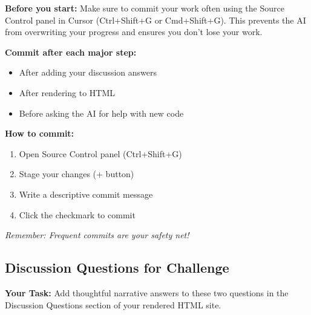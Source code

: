 \documentclass[
  letterpaper,
  DIV=11,
  numbers=noendperiod]{scrartcl}
\providecommand{\tightlist}{%
  \setlength{\itemsep}{0pt}\setlength{\parskip}{0pt}}
\begin{document}
\begin{tcolorbox}[enhanced jigsaw, bottomtitle=1mm, coltitle=black, rightrule=.15mm, colbacktitle=quarto-callout-warning-color!10!white, opacityback=0, colback=white, toptitle=1mm, title=\textcolor{quarto-callout-warning-color}{\faExclamationTriangle}\hspace{0.5em}{💾 Important: Save Your Work Frequently!}, titlerule=0mm, left=2mm, arc=.35mm, colframe=quarto-callout-warning-color-frame, leftrule=.75mm, bottomrule=.15mm, toprule=.15mm, opacitybacktitle=0.6, breakable]

\textbf{Before you start:} Make sure to commit your work often using the
Source Control panel in Cursor (Ctrl+Shift+G or Cmd+Shift+G). This
prevents the AI from overwriting your progress and ensures you don't
lose your work.

\textbf{Commit after each major step:}

\begin{itemize}
\tightlist
\item
  After adding your discussion answers
\item
  After rendering to HTML
\item
  Before asking the AI for help with new code
\end{itemize}

\textbf{How to commit:}

\begin{enumerate}
\def\labelenumi{\arabic{enumi}.}
\tightlist
\item
  Open Source Control panel (Ctrl+Shift+G)
\item
  Stage your changes (+ button)
\item
  Write a descriptive commit message
\item
  Click the checkmark to commit
\end{enumerate}

\emph{Remember: Frequent commits are your safety net!}

\end{tcolorbox}

\subsection{Discussion Questions for
Challenge}\label{discussion-questions-for-challenge}

\textbf{Your Task:} Add thoughtful narrative answers to these two
questions in the Discussion Questions section of your rendered HTML
site.
\end{document}
